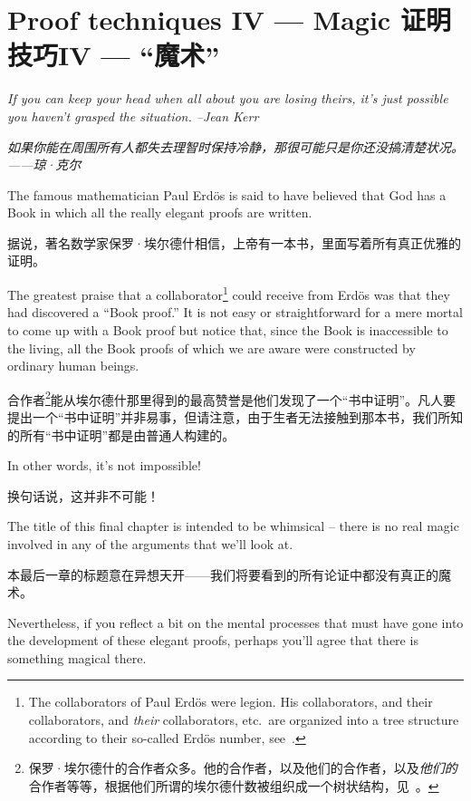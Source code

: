 \chapter{Proof techniques IV --- Magic 证明技巧IV --- “魔术”}
\label{ch:magic}

{\em If you can keep your head when all about you are losing theirs, it's 
just possible you haven't grasped the situation. --Jean Kerr} 

{\em 如果你能在周围所有人都失去理智时保持冷静，那很可能只是你还没搞清楚状况。——琼·克尔} 

\vspace{.3in}

The famous mathematician 
 Paul Erd\"{o}s is said to have believed that
God has a Book in which all the really elegant proofs are written.

据说，著名数学家保罗·埃尔德什相信，上帝有一本书，里面写着所有真正优雅的证明。

The greatest praise that a collaborator\footnote{The collaborators
of Paul Erd\"{o}s were legion. His collaborators, and their collaborators,
and \emph{their} collaborators, etc.\ are organized into a tree structure 
according to their so-called Erd\"{o}s number,
see~\cite{wiki-Erdos_number}.} could receive from Erd\"{o}s
was that they had discovered a ``Book proof.''   It is not
easy or straightforward for a mere mortal to come up with a Book 
proof but notice that, since the Book is inaccessible to the living,
all the Book proofs of which we are aware were constructed by ordinary
human beings.

合作者\footnote{保罗·埃尔德什的合作者众多。他的合作者，以及他们的合作者，以及\emph{他们的}合作者等等，根据他们所谓的埃尔德什数被组织成一个树状结构，见~\cite{wiki-Erdos_number}。}能从埃尔德什那里得到的最高赞誉是他们发现了一个“书中证明”。凡人要提出一个“书中证明”并非易事，但请注意，由于生者无法接触到那本书，我们所知的所有“书中证明”都是由普通人构建的。

In other words, it's not impossible!

换句话说，这并非不可能！

The title of this final chapter is intended to be whimsical -- there
is no real magic involved in any of the arguments that we'll look at.

本最后一章的标题意在异想天开——我们将要看到的所有论证中都没有真正的魔术。

Nevertheless, if you  reflect a bit on the mental processes that 
must have gone into the development of these elegant proofs, perhaps
you'll agree that there is something magical there.

